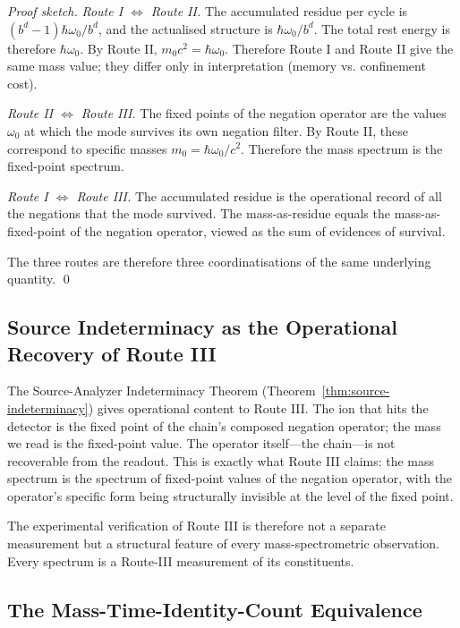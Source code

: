 \documentclass[twocolumn,10pt,a4paper]{article}
\theoremstyle{definition}
\theoremstyle{remark}
\begin{document}
\begin{proof}[Proof sketch]
\emph{Route I $\Leftrightarrow$ Route II.} The accumulated residue per cycle is $(b^d - 1)\hbar\omega_0/b^d$, and the actualised structure is $\hbar\omega_0/b^d$. The total rest energy is therefore $\hbar\omega_0$. By Route II, $m_0 c^2 = \hbar\omega_0$. Therefore Route I and Route II give the same mass value; they differ only in interpretation (memory vs. confinement cost).

\emph{Route II $\Leftrightarrow$ Route III.} The fixed points of the negation operator are the values $\omega_0$ at which the mode survives its own negation filter. By Route II, these correspond to specific masses $m_0 = \hbar\omega_0/c^2$. Therefore the mass spectrum is the fixed-point spectrum.

\emph{Route I $\Leftrightarrow$ Route III.} The accumulated residue is the operational record of all the negations that the mode survived. The mass-as-residue equals the mass-as-fixed-point of the negation operator, viewed as the sum of evidences of survival.

The three routes are therefore three coordinatisations of the same underlying quantity. \qed
\end{proof}

\subsection{Source Indeterminacy as the Operational Recovery of Route III}

The Source-Analyzer Indeterminacy Theorem (Theorem~\ref{thm:source-indeterminacy}) gives operational content to Route III. The ion that hits the detector is the fixed point of the chain's composed negation operator; the mass we read is the fixed-point value. The operator itself---the chain---is not recoverable from the readout. This is exactly what Route III claims: the mass spectrum is the spectrum of fixed-point values of the negation operator, with the operator's specific form being structurally invisible at the level of the fixed point.

The experimental verification of Route III is therefore not a separate measurement but a structural feature of every mass-spectrometric observation. Every spectrum is a Route-III measurement of its constituents.

\subsection{The Mass-Time-Identity-Count Equivalence}
\end{document}
